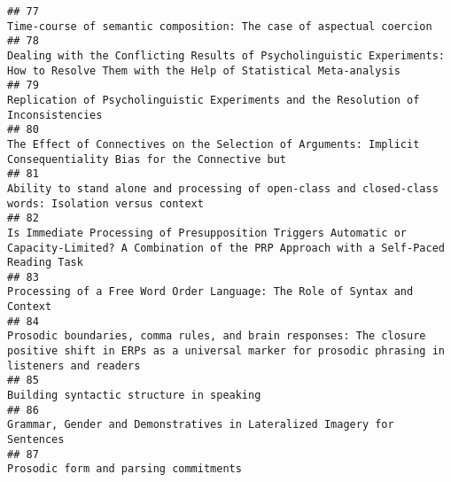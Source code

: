 \documentclass[
  english,
  man]{apa6}
\begin{document}
\begin{verbatim}
## 77                                                                                                                                                                       Time-course of semantic composition: The case of aspectual coercion
## 78                                                                                                      Dealing with the Conflicting Results of Psycholinguistic Experiments: How to Resolve Them with the Help of Statistical Meta-analysis
## 79                                                                                                                                                         Replication of Psycholinguistic Experiments and the Resolution of Inconsistencies
## 80                                                                                                                            The Effect of Connectives on the Selection of Arguments: Implicit Consequentiality Bias for the Connective but
## 81                                                                                                                                      Ability to stand alone and processing of open-class and closed-class words: Isolation versus context
## 82                                                                                        Is Immediate Processing of Presupposition Triggers Automatic or Capacity-Limited? A Combination of the PRP Approach with a Self-Paced Reading Task
## 83                                                                                                                                                                  Processing of a Free Word Order Language: The Role of Syntax and Context
## 84                                                                            Prosodic boundaries, comma rules, and brain responses: The closure positive shift in ERPs as a universal marker for prosodic phrasing in listeners and readers
## 85                                                                                                                                                                                                  Building syntactic structure in speaking
## 86                                                                                                                                                                   Grammar, Gender and Demonstratives in Lateralized Imagery for Sentences
## 87                                                                                                                                                                                                     Prosodic form and parsing commitments

\end{verbatim}
\end{document}
